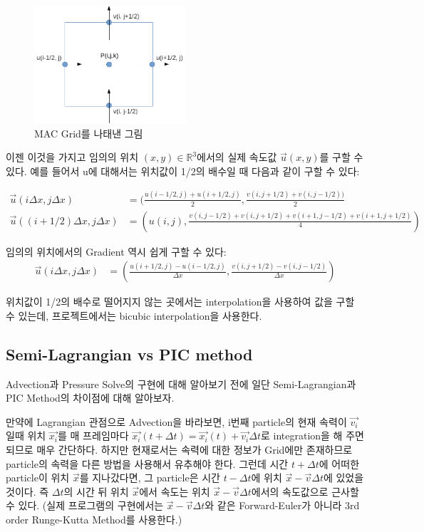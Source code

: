 \documentclass[10pt, A4]{article}
\begin{document}
\begin{figure}[h]
\centering
\includegraphics[width=0.5\textwidth]{mac_grid}
\caption{MAC Grid를 나태낸 그림}
\end{figure}

이젠 이것을 가지고 임의의 위치 $(x, y) \in \mathbb{R}^3$에서의 실제 속도값 $\vec{u}(x, y)$를 구할 수 있다. 예를 들어서 u에 대해서는 위치값이 1/2의 배수일 때 다음과 같이 구할 수 있다:

\begin{align*} 
  \vec{u}(i \Delta x, j \Delta x) &= (\frac{u(i-1/2, j) + u(i+1/2, j)}{2}, \frac{v(i,j+1/2) + v(i,j-1/2))}{2} \\
  \vec{u}((i+1/2) \Delta x, j \Delta x) &= (u(i,j), \frac{v(i,j-1/2) + v(i,j+1/2) + v(i+1,j-1/2) + v(i+1,j+1/2)}{4})
\end{align*}

임의의 위치에서의 Gradient 역시 쉽게 구할 수 있다:
\begin{align*}
  \vec{u}(i \Delta x, j \Delta x) &= (\frac{u(i+1/2, j) - u(i-1/2, j)}{\Delta x}, \frac{v(i,j+1/2) - v(i,j-1/2)}{\Delta x})
\end{align*}

위치값이 1/2의 배수로 떨어지지 않는 곳에서는 interpolation을 사용하여 값을 구할 수 있는데, 프로젝트에서는 bicubic interpolation을 사용한다.

\subsection{Semi-Lagrangian vs PIC method}

Advection과 Pressure Solve의 구현에 대해 알아보기 전에 일단 Semi-Lagrangian과 PIC Method의 차이점에 대해 알아보자.

만약에 Lagrangian 관점으로 Advection을 바라보면, i번째 particle의 현재 속력이 $\vec{v_i}$일때 위치 $\vec{x_i}$를 매 프레임마다 $\vec{x_i}(t + \Delta t) = \vec{x_i}(t) + \vec{v_i} \Delta t$로 integration을 해 주면 되므로 매우 간단하다. 하지만 현재로서는 속력에 대한 정보가 Grid에만 존재하므로 particle의 속력을 다른 방법을 사용해서 유추해야 한다. 그런데 시간 $t + \Delta t$에 어떠한 particle이 위치 $\vec{x}$를 지나갔다면, 그 particle은 시간 $t - \Delta t$에 위치 $\vec{x} - \vec{v} \Delta t$에 있었을 것이다. 즉 $\Delta t$의 시간 뒤 위치 $\vec{x}$에서 속도는 위치 $\vec{x} - \vec{v} \Delta t$에서의 속도값으로 근사할 수 있다. (실제 프로그램의 구현에서는 $\vec{x} - \vec{v} \Delta t$와 같은 Forward-Euler가 아니라 3rd order Runge-Kutta Method를 사용한다.)
\end{document}
